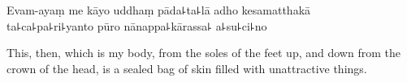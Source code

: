Evam-ayaṃ me kāyo uddhaṃ pāda꜕ta꜕lā adho kesamatthakā\\
ta꜕ca꜕pa꜕ri꜕yanto pūro nānappa꜕kārassa꜕ a꜕su꜕ci꜕no

\begin{english}
  This, then, which is my body, from the soles of the feet up, and down from the crown of the head, is a sealed bag of skin filled with unattractive things.
\end{english}


